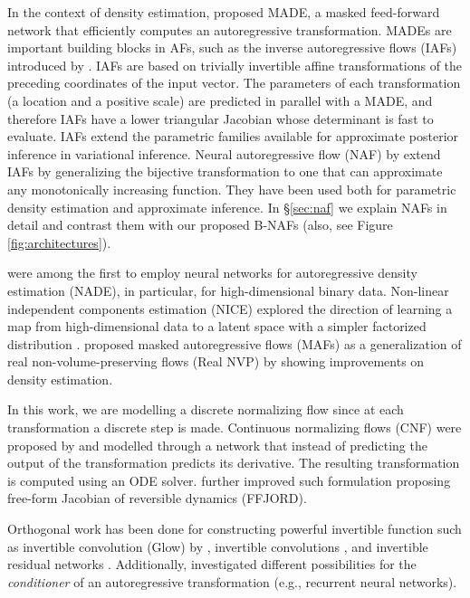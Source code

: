 \documentclass[letterpaper]{article}
\begin{document}
In the context of density estimation, \citet{germain2015made} proposed MADE, a masked feed-forward network that efficiently computes an autoregressive transformation. MADEs are important building blocks in AFs, such as the inverse autoregressive flows (IAFs) introduced by \citet{kingma2016improved}. IAFs are based on trivially invertible affine transformations of the preceding coordinates of the input vector. The parameters of each transformation (a location and a positive scale) are predicted in parallel with a MADE, and therefore IAFs have a lower triangular Jacobian whose determinant is fast to evaluate. IAFs extend the parametric families available for approximate posterior inference in variational inference. Neural autoregressive flow (NAF) by \citet{huang2018neural} extend IAFs by generalizing the bijective transformation to one that can approximate any monotonically increasing function. They have been used both for parametric density estimation and approximate inference. In \S\ref{sec:naf} we explain NAFs in detail and contrast them with our proposed B-NAFs (also, see Figure \ref{fig:architectures}).

\citet{larochelle2011neural} were among the first to employ neural networks for autoregressive density estimation (NADE), in particular, for high-dimensional binary data. Non-linear independent components estimation (NICE) explored the direction of learning a map from high-dimensional data to a latent space with a simpler factorized distribution \citep{dinh2014nice}. \citet{papamakarios2017masked} proposed masked autoregressive flows (MAFs) as a generalization of real non-volume-preserving flows (Real NVP) by \citet{dinh2016density} showing improvements on density estimation.

In this work, we are modelling a discrete normalizing flow since at each transformation a discrete step is made. Continuous normalizing flows (CNF) were proposed by \citet{chen2018neural} and modelled through a network that instead of predicting the output of the transformation predicts its derivative. The resulting transformation is computed using an ODE solver. \citet{grathwohl2018ffjord} further improved such formulation proposing free-form Jacobian of reversible dynamics (FFJORD).

Orthogonal work has been done for constructing powerful invertible function such as invertible  convolution (Glow) by \citet{kingma2018glow}, invertible  convolutions \citep{hoogeboom2019emerging}, and invertible residual networks \citep{behrmann2018invertible}. Additionally, \citet{pmlr-v80-oliva18a} investigated different possibilities for the \emph{conditioner} of an autoregressive transformation (e.g., recurrent neural networks).
\end{document}
